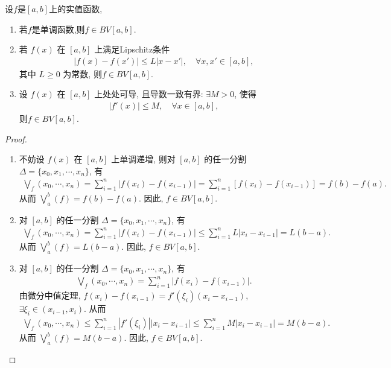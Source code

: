 \documentclass[../../main.tex]{subfiles}%
\begin{document}
\begin{proposition}\label{proposition:常见的一些有界变差函数}
设$f$是$[a,b]$上的实值函数,
\begin{enumerate}[(1)]
\item\label{proposition:常见的一些有界变差函数-1} 若$f$是单调函数,则$f\in BV[a,b]$.

\item\label{proposition:常见的一些有界变差函数-2} 若 $f(x)$ 在 $[a,b]$ 上满足Lipschitz条件
\begin{align*}
|f(x)-f(x')| \leqslant L|x-x'|, \quad \forall x,x'\in[a,b],
\end{align*}
其中 $L\geqslant 0$ 为常数, 则$f\in BV[a,b]$.

\item\label{proposition:常见的一些有界变差函数-3} 设 $f(x)$ 在 $[a,b]$ 上处处可导, 且导数一致有界: $\exists M>0$, 使得
\begin{align*}
|f'(x)| \leqslant M, \quad \forall x\in[a,b],
\end{align*}
则$f\in BV[a,b]$.
\end{enumerate}
\end{proposition}
\begin{proof}
\begin{enumerate}[(1)]
\item 不妨设 $f(x)$ 在 $[a,b]$ 上单调递增, 则对 $[a,b]$ 的任一分割 $\Delta = \{x_0, x_1, \cdots, x_n\}$, 有
\begin{align*}
\bigvee_f(x_0, \cdots, x_n) = \sum_{i=1}^n |f(x_i)-f(x_{i-1})| 
= \sum_{i=1}^n [f(x_i)-f(x_{i-1})] = f(b)-f(a).
\end{align*}
从而 $\bigvee_a^b(f) = f(b)-f(a)$. 因此, $f\in BV[a,b]$.

\item 对 $[a,b]$ 的任一分割 $\Delta = \{x_0, x_1, \cdots, x_n\}$, 有
\begin{align*}
\bigvee_f(x_0, \cdots, x_n) = \sum_{i=1}^n |f(x_i)-f(x_{i-1})| 
\leqslant \sum_{i=1}^n L|x_i-x_{i-1}| = L(b-a).
\end{align*}
从而 $\bigvee_a^b(f) = L(b-a)$. 因此, $f\in BV[a,b]$.

\item 对 $[a,b]$ 的任一分割 $\Delta = \{x_0, x_1, \cdots, x_n\}$, 有
\begin{align*}
\bigvee_f(x_0, \cdots, x_n) = \sum_{i=1}^n |f(x_i)-f(x_{i-1})|.
\end{align*}
由微分中值定理, $f(x_i)-f(x_{i-1}) = f'(\xi_i)(x_i-x_{i-1})$, $\exists \xi_i\in(x_{i-1},x_i)$. 从而
\begin{align*}
\bigvee_f(x_0, \cdots, x_n) \leqslant \sum_{i=1}^n |f'(\xi_i)||x_i-x_{i-1}| \leqslant \sum_{i=1}^n M|x_i-x_{i-1}| = M(b-a).
\end{align*}
从而 $\bigvee_a^b(f) = M(b-a)$. 因此, $f\in BV[a,b]$.
\end{enumerate}
\end{proof}
\end{document}
